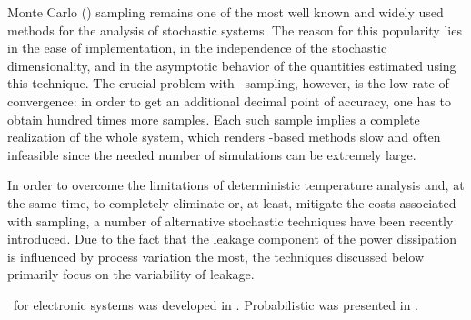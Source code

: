 Monte Carlo (\MC) sampling remains one of the most well known and widely used methods for the analysis of stochastic systems.
The reason for this popularity lies in the ease of implementation, in the independence of the stochastic dimensionality, and in the asymptotic behavior of the quantities estimated using this technique.
The crucial problem with \MC\ sampling, however, is the low rate of convergence: in order to get an additional decimal point of accuracy, one has to obtain hundred times more samples.
Each such sample implies a complete realization of the whole system, which renders \MC-based methods slow and often infeasible since the needed number of simulations can be extremely large.

In order to overcome the limitations of deterministic temperature analysis and, at the same time, to completely eliminate or, at least, mitigate the costs associated with  sampling, a number of alternative stochastic techniques have been recently introduced.
Due to the fact that the leakage component of the power dissipation is influenced by process variation the most, the techniques discussed below primarily focus on the variability of leakage.

\Dssta\ for electronic systems was developed in \cite{ukhov2012}.
Probabilistic \tta was presented in \cite{ukhov2014}.
